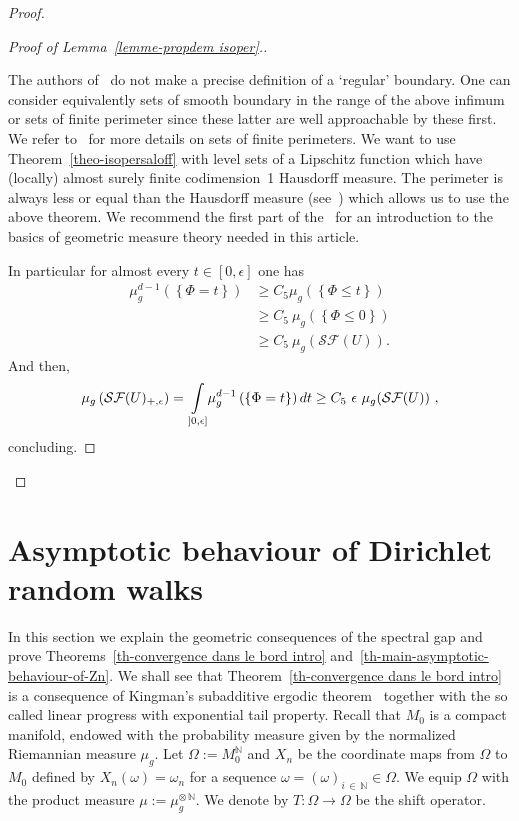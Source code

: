 \documentclass[AHL,Unicode,longabstracts,published]{cedram}
\newcommand{\cSF}{\mathcal{SF}}
\newcommand{\N}{\mathbb{N}}
\newcommand{\NN}{\mathbb{N}}
\newcommand{\inte}[1]{\underset{#1}{\int}}
\newcommand{\tv}{\rightarrow}
\begin{document}
\begin{proof}
\begin{proof}[Proof of Lemma~\ref{lemme-propdem isoper}.]
\begin{rema}
The authors of~\cite{artcoulhonsaloffisometrie} do not make a precise definition of a `regular' boundary. One can consider equivalently sets of smooth boundary in the range of the above infimum or sets of finite perimeter since these latter are well approachable by these first. We refer to~\cite[Chapter~5]{livretheoriegeommeasure} for more details on sets of finite perimeters. We want to use Theorem~\ref{theo-isopersaloff} with level sets of a Lipschitz function which have (locally) almost surely finite codimension~1 Hausdorff measure. The perimeter is always less or equal than the Hausdorff measure (see~\cite[Section~5.7]{livretheoriegeommeasure}) which allows us to use the above theorem. We recommend the first part of the~\cite{surveynonlocalperimeter} for an introduction to the basics of geometric measure theory needed in this article.
\end{rema}

In particular for almost every $t \in [0, \epsilon]$ one has
\begin{align*}
\mu_g^{d-1}\left(\left\{ \Phi =t \right\}\right) & \ge C_5 \mu_g\left(\left\{ \Phi \le t \right\}\right) \\
& \ge C_5 \ \mu_g\left(\left\{ \Phi \le 0 \right\}\right) \\
& \ge C_5 \ \mu_g\left(\cSF(U)\right) .
\end{align*}
And then,
\[
\mu_g\left(\cSF(U)_{+, \epsilon}\right) = \inte{]0,\epsilon]} \mu_g^{d-1}\left(\left\{ \Phi =t \right\}\right) dt \\
\ge C_5 \ \epsilon \ \mu_g(\cSF(U)) \ ,
\]
concluding.
\end{proof}
\end{proof}



\section{Asymptotic behaviour of Dirichlet random walks}\label{sec-central_limit_theorem}


In this section we explain the geometric consequences of the spectral gap and prove Theorems~\ref{th-convergence dans le bord intro} and~\ref{th-main-asymptotic-behaviour-of-Zn}. We shall see that Theorem~\ref{th-convergence dans le bord intro} is a consequence of Kingman's subadditive ergodic theorem~\cite{kingman} together with the so called linear progress with exponential tail property. Recall that $M_0$ is a compact manifold, endowed with the probability measure given by the normalized Riemannian measure $\mu_g$. Let $\Omega := M_0^\NN$ and $X_n$ be the coordinate maps from $\Omega$ to $M_0$ defined by $X_n(\omega) = \omega_n$ for a sequence $\omega=(\omega)_{i\,\in\,\N} \in \Omega$. We equip $\Omega$ with the product measure $\mu :=\mu_g^{\otimes\,\N}$. We denote by $T: \Omega \tv \Omega $ be the shift operator.
\end{document}
